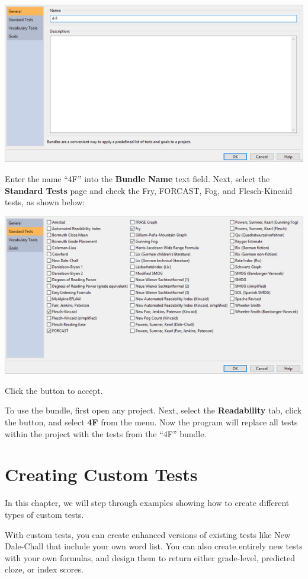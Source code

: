 \documentclass[
]{book}
\theoremstyle{definition}
\theoremstyle{definition}
\theoremstyle{definition}
\theoremstyle{definition}
\theoremstyle{remark}
\begin{document}
\includegraphics{Images/TestBundle.png}

Enter the name ``4F'' into the \textbf{Bundle Name} text field. Next, select the \textbf{Standard Tests} page and check the Fry, FORCAST, Fog, and Flesch-Kincaid tests, as shown below:

\includegraphics{Images/TestBundle4F.png}

Click the  button to accept.

To use the bundle, first open any project. Next, select the \textbf{Readability} tab, click the  button, and select \textbf{4F} from the menu. Now the program will replace all tests within the project with the tests from the ``4F'' bundle.

\hypertarget{creating-custom-tests}{%
\chapter{Creating Custom Tests}\label{creating-custom-tests}}

In this chapter, we will step through examples showing how to create different types of custom tests.

With custom tests, you can create enhanced versions of existing tests like New Dale-Chall that include your own word list. You can also create entirely new tests with your own formulas, and design them to return either grade-level, predicted cloze, or index scores.
\end{document}
